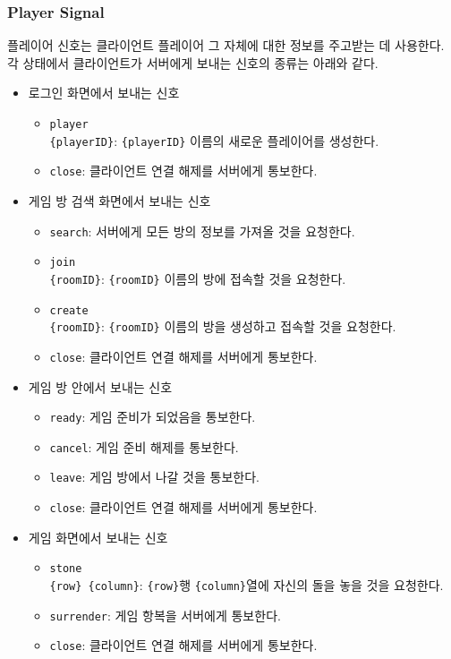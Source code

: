 \documentclass[a4paper, 10pt]{article}
\begin{document}
\subsubsection{Player Signal}
플레이어 신호는 클라이언트 플레이어 그 자체에 대한 정보를 주고받는 데 사용한다.
각 상태에서 클라이언트가 서버에게 보내는 신호의 종류는 아래와 같다.
\begin{itemize}
  \item 로그인 화면에서 보내는 신호
  \begin{itemize}
    \item \texttt{player\\\{playerID\}}: \texttt{\{playerID\}} 이름의 새로운 플레이어를 생성한다.
    \item \texttt{close}: 클라이언트 연결 해제를 서버에게 통보한다.
  \end{itemize}
  \item 게임 방 검색 화면에서 보내는 신호
  \begin{itemize}
    \item \texttt{search}: 서버에게 모든 방의 정보를 가져올 것을 요청한다.
    \item \texttt{join\\\{roomID\}}: \texttt{\{roomID\}} 이름의 방에 접속할 것을 요청한다.
    \item \texttt{create\\\{roomID\}}: \texttt{\{roomID\}} 이름의 방을 생성하고 접속할 것을 요청한다.
    \item \texttt{close}: 클라이언트 연결 해제를 서버에게 통보한다.
  \end{itemize}
  \item 게임 방 안에서 보내는 신호
  \begin{itemize}
    \item \texttt{ready}: 게임 준비가 되었음을 통보한다.
    \item \texttt{cancel}: 게임 준비 해제를 통보한다.
    \item \texttt{leave}: 게임 방에서 나갈 것을 통보한다.
    \item \texttt{close}: 클라이언트 연결 해제를 서버에게 통보한다.
  \end{itemize}
  \item 게임 화면에서 보내는 신호
  \begin{itemize}
    \item \texttt{stone\\\{row\} \{column\}}: \texttt{\{row\}}행 \texttt{\{column\}}열에 자신의 돌을 놓을 것을 요청한다.
    \item \texttt{surrender}: 게임 항복을 서버에게 통보한다.
    \item \texttt{close}: 클라이언트 연결 해제를 서버에게 통보한다.
  \end{itemize}
\end{itemize}
\end{document}
